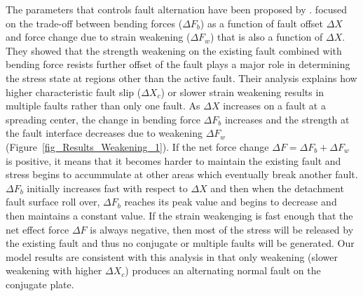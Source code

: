 The parameters that controls fault alternation have been proposed by \citet{Lavier2000}. \citet{Lavier2000} focused on the trade-off between bending forces ($\Delta F_{b}$) as a function of fault offset $\Delta X$ and force change due to strain weakening ($\Delta F_{w}$) that is also a function of  $\Delta X$. They showed that the strength weakening on the existing fault combined with bending force resists further offset of the fault plays a major role in determining the stress state at regions other than the active fault. Their analysis explains how higher characteristic fault slip ($\Delta X_{c}$) or slower strain weakening results in multiple faults rather than only one fault. %
 As $\Delta X$ increases on a fault at a spreading center, the change in bending force $\Delta F_{b}$ increases and the strength at the fault interface decreases due to weakening $\Delta F_{w}$ (Figure~\hyperref[fig_Results_Weakening_1]{\ref{fig_Results_Weakening_1}}). If the net force change $\Delta F = \Delta F_{b}+ \Delta F_{w}$ is positive, it means that it becomes harder to maintain the existing fault and stress begins to accummulate at other areas which eventually break another fault. $\Delta F_{b}$ initially increases fast with respect to $\Delta X$ and then when the detachment fault surface roll over, $\Delta F_{b}$ reaches its peak value and begins to decrease and then maintains a constant value. If the strain weakenging is fast enough that the net effect force $\Delta F$ is always negative, then most of the stress will be released by the existing fault and thus no conjugate or multiple faults will be generated. 
Our model results are consistent with this analysis in that only weakening (slower weakening with higher $\Delta X_{c}$) produces an alternating normal fault on the conjugate plate.


